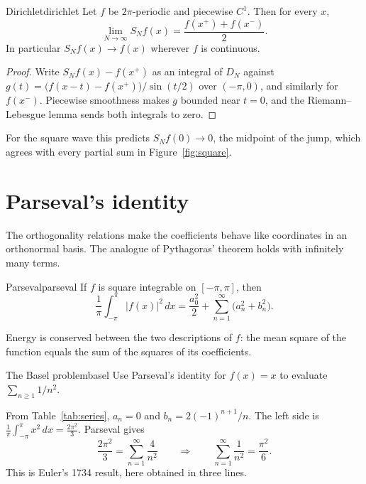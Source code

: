 \documentclass[11pt]{article}
\begin{document}
\begin{theorem}{Dirichlet}{dirichlet}
Let $f$ be $2\pi$-periodic and piecewise $C^1$. Then for every $x$,
\[
  \lim_{N\to\infty} S_N f(x) = \frac{f(x^+)+f(x^-)}{2}.
\]
In particular $S_N f(x)\to f(x)$ wherever $f$ is continuous.
\end{theorem}

\begin{proof}
Write $S_N f(x) - f(x^+)$ as an integral of $D_N$ against
$g(t)=\bigl(f(x-t)-f(x^+)\bigr)/\sin(t/2)$ over $(-\pi,0)$, and similarly for
$f(x^-)$. Piecewise smoothness makes $g$ bounded near $t=0$, and the
Riemann--Lebesgue lemma sends both integrals to zero.
\end{proof}

For the square wave this predicts $S_N f(0)\to 0$, the midpoint of the jump,
which agrees with every partial sum in Figure~\ref{fig:square}.

\section{Parseval's identity}

The orthogonality relations make the coefficients behave like coordinates in an
orthonormal basis. The analogue of Pythagoras' theorem holds with infinitely
many terms.

\begin{theorem}{Parseval}{parseval}
If $f$ is square integrable on $[-\pi,\pi]$, then
\[
  \frac{1}{\pi}\int_{-\pi}^{\pi}|f(x)|^2\,dx
  = \frac{a_0^2}{2} + \sum_{n=1}^{\infty}\bigl(a_n^2+b_n^2\bigr).
\]
\end{theorem}

\begin{keyidea}
Energy is conserved between the two descriptions of $f$: the mean square of
the function equals the sum of the squares of its coefficients.
\end{keyidea}

\begin{example}{The Basel problem}{basel}
Use Parseval's identity for $f(x)=x$ to evaluate $\sum_{n\ge1}1/n^2$.
\begin{solution}
From Table~\ref{tab:series}, $a_n=0$ and $b_n = 2(-1)^{n+1}/n$. The left side is
$\frac{1}{\pi}\int_{-\pi}^{\pi}x^2\,dx = \frac{2\pi^2}{3}$. Parseval gives
\[
  \frac{2\pi^2}{3} = \sum_{n=1}^{\infty}\frac{4}{n^2}
  \qquad\Longrightarrow\qquad
  \sum_{n=1}^{\infty}\frac{1}{n^2} = \frac{\pi^2}{6}.
\]
This is Euler's 1734 result, here obtained in three lines.
\end{solution}
\end{example}
\end{document}
